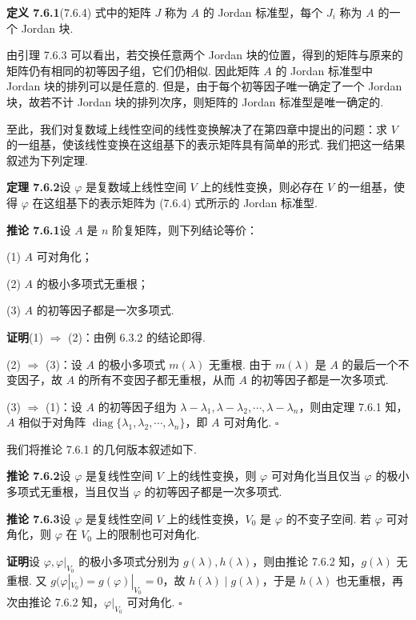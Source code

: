 \documentclass[UTF8,12pt,a4paper,fontset=fandol]{ctexart}
\begin{document}
\noindent\textbf{定义 7.6.1}\quad (7.6.4) 式中的矩阵 $J$ 称为 $A$ 的 Jordan 标准型，每个 $J_i$ 称为 $A$ 的一个 Jordan 块.

由引理 7.6.3 可以看出，若交换任意两个 Jordan 块的位置，得到的矩阵与原来的矩阵仍有相同的初等因子组，它们仍相似. 因此矩阵 $A$ 的 Jordan 标准型中 Jordan 块的排列可以是任意的. 但是，由于每个初等因子唯一确定了一个 Jordan 块，故若不计 Jordan 块的排列次序，则矩阵的 Jordan 标准型是唯一确定的.

至此，我们对复数域上线性空间的线性变换解决了在第四章中提出的问题：求 $V$ 的一组基，使该线性变换在这组基下的表示矩阵具有简单的形式. 我们把这一结果叙述为下列定理.

\noindent\textbf{定理 7.6.2}\quad 设 $\varphi$ 是复数域上线性空间 $V$ 上的线性变换，则必存在 $V$ 的一组基，使得 $\varphi$ 在这组基下的表示矩阵为 (7.6.4) 式所示的 Jordan 标准型.

\noindent\textbf{推论 7.6.1}\quad 设 $A$ 是 $n$ 阶复矩阵，则下列结论等价：

(1) $A$ 可对角化；

(2) $A$ 的极小多项式无重根；

(3) $A$ 的初等因子都是一次多项式.

\noindent\textbf{证明}\quad (1) $\Rightarrow$ (2)：由例 6.3.2 的结论即得.

(2) $\Rightarrow$ (3)：设 $A$ 的极小多项式 $m(\lambda)$ 无重根. 由于 $m(\lambda)$ 是 $A$ 的最后一个不变因子，故 $A$ 的所有不变因子都无重根，从而 $A$ 的初等因子都是一次多项式.

(3) $\Rightarrow$ (1)：设 $A$ 的初等因子组为 $\lambda-\lambda_1,\lambda-\lambda_2,\cdots,\lambda-\lambda_n$，则由定理 7.6.1 知，$A$ 相似于对角阵 $\operatorname{diag}\{\lambda_1,\lambda_2,\cdots,\lambda_n\}$，即 $A$ 可对角化. $\square$

我们将推论 7.6.1 的几何版本叙述如下.

\noindent\textbf{推论 7.6.2}\quad 设 $\varphi$ 是复线性空间 $V$ 上的线性变换，则 $\varphi$ 可对角化当且仅当 $\varphi$ 的极小多项式无重根，当且仅当 $\varphi$ 的初等因子都是一次多项式.

\noindent\textbf{推论 7.6.3}\quad 设 $\varphi$ 是复线性空间 $V$ 上的线性变换，$V_0$ 是 $\varphi$ 的不变子空间. 若 $\varphi$ 可对角化，则 $\varphi$ 在 $V_0$ 上的限制也可对角化.

\noindent\textbf{证明}\quad 设 $\varphi,\varphi|_{V_0}$ 的极小多项式分别为 $g(\lambda),h(\lambda)$，则由推论 7.6.2 知，$g(\lambda)$ 无重根. 又 $g(\varphi|_{V_0})=g(\varphi)|_{V_0}=0$，故 $h(\lambda)\mid g(\lambda)$，于是 $h(\lambda)$ 也无重根，再次由推论 7.6.2 知，$\varphi|_{V_0}$ 可对角化. $\square$
\end{document}
